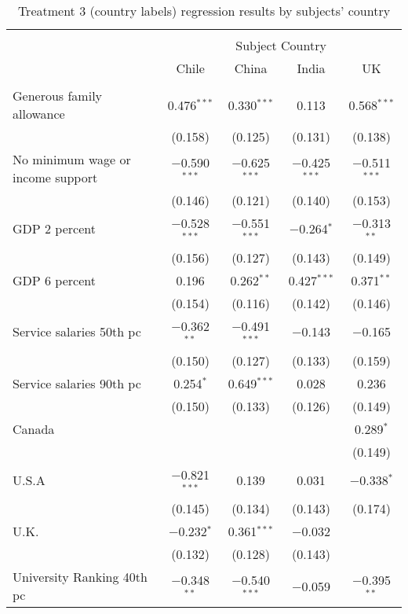 
\begin{table}[!htbp] \centering 
  \caption{Treatment 3 (country labels) regression results by subjects' country} 
  \label{tab:treat_3} 
\begin{tabular}{@{\extracolsep{5pt}}lcccc} 
\\[-1.8ex]\hline 
\hline \\[-1.8ex] 
 & \multicolumn{4}{c}{Subject Country} \\ 
\cline{2-5} 
 & Chile & China & India & UK \\ 
\hline \\[-1.8ex] 
 Generous family allowance & 0.476$^{***}$ & 0.330$^{***}$ & 0.113 & 0.568$^{***}$ \\ 
  & (0.158) & (0.125) & (0.131) & (0.138) \\ 
  No minimum wage or income support & $-$0.590$^{***}$ & $-$0.625$^{***}$ & $-$0.425$^{***}$ & $-$0.511$^{***}$ \\ 
  & (0.146) & (0.121) & (0.140) & (0.153) \\ 
  GDP 2 percent & $-$0.528$^{***}$ & $-$0.551$^{***}$ & $-$0.264$^{*}$ & $-$0.313$^{**}$ \\ 
  & (0.156) & (0.127) & (0.143) & (0.149) \\ 
  GDP 6 percent & 0.196 & 0.262$^{**}$ & 0.427$^{***}$ & 0.371$^{**}$ \\ 
  & (0.154) & (0.116) & (0.142) & (0.146) \\ 
  Service salaries 50th pc & $-$0.362$^{**}$ & $-$0.491$^{***}$ & $-$0.143 & $-$0.165 \\ 
  & (0.150) & (0.127) & (0.133) & (0.159) \\ 
  Service salaries 90th pc & 0.254$^{*}$ & 0.649$^{***}$ & 0.028 & 0.236 \\ 
  & (0.150) & (0.133) & (0.126) & (0.149) \\ 
  Canada &  &  &  & 0.289$^{*}$ \\ 
  &  &  &  & (0.149) \\ 
  U.S.A & $-$0.821$^{***}$ & 0.139 & 0.031 & $-$0.338$^{*}$ \\ 
  & (0.145) & (0.134) & (0.143) & (0.174) \\ 
  U.K. & $-$0.232$^{*}$ & 0.361$^{***}$ & $-$0.032 &  \\ 
  & (0.132) & (0.128) & (0.143) &  \\ 
  University Ranking 40th pc & $-$0.348$^{**}$ & $-$0.540$^{***}$ & $-$0.059 & $-$0.395$^{**}$ \\ 

\end{tabular}
\end{table}
